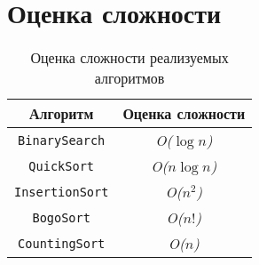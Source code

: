 \section*{Оценка сложности}

\begin{table}[H]
    \centering
    \caption{Оценка сложности реализуемых алгоритмов}
    \begin{tabular}{|c|c|}
        \hline
        Алгоритм & Оценка сложности \\ 
        \hline
        \verb|BinarySearch| & \textit{O($ \log{n} $)} \\ 
        \hline
        \verb|QuickSort| & \textit{O($ n \log{n} $)} \\ 
        \hline
        \verb|InsertionSort| & \textit{O($ n^2 $)} \\ 
        \hline
        \verb|BogoSort| & \textit{O($ n! $)} \\ 
        \hline
        \verb|CountingSort| & \textit{O($ n $)} \\
        \hline
        \hline
    \end{tabular}
\end{table}



